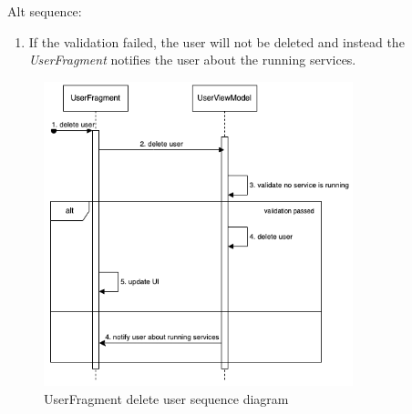 Alt sequence:
\begin{enumerate}[start=4]
    \item If the validation failed, the user will not be deleted and instead the \emph{UserFragment} notifies the user about the running services.
\end{enumerate}


\begin{figure}[H]
    \centering
    \includegraphics[width=0.8\textwidth]{diagrams/delete-user-frag-seq.drawio.png}
    \caption{UserFragment delete user sequence diagram}
    \label{fig:userfragment_delete_user}
\end{figure}